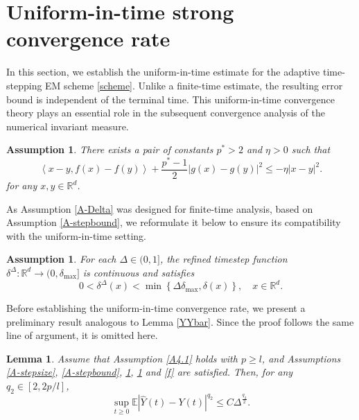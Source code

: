 \documentclass[preprint,12pt,compress]{elsarticle}
\newtheorem{lemma}[theorem]{Lemma}%
\newtheorem{assumption}[theorem]{Assumption}
\begin{document}
\section{Uniform-in-time strong convergence rate}  \label{sec6}
In this section, we establish the uniform-in-time estimate for the adaptive time-stepping EM scheme \eqref{scheme}. Unlike a finite-time estimate, the resulting error bound is independent of the terminal time. This uniform-in-time convergence theory plays an essential role in the subsequent convergence analysis of the numerical invariant measure.


\begin{assumption}  \label{A5.1}
There exists a pair of constants $p^* > 2$ and $\eta>0$ such that 
\begin{equation*}
	\left\langle {x - y,f(x) - f(y)} \right\rangle  + \frac{{{p^*} - 1}}{2}{\left| {g(x) - g(y)} \right|^2} \le  - \eta {\left| {x - y} \right|^2}.
\end{equation*}
for any $x, y \in \mathbb{R}^d$.
\end{assumption}

As Assumption \ref{A-Delta} was designed for finite-time analysis, based on Assumption \ref{A-stepbound}, we reformulate it below to ensure its compatibility with the uniform-in-time setting.
\begin{assumption}  \label{A6.2}
For each $\Delta \in (0, 1]$, the refined timestep function $\delta^\Delta: \mathbb{R}^d \to (0, \delta_{\max}]$ is continuous and satisfies
\begin{equation*}
	0 < {\delta ^\Delta }(x) < \min \left\{ {\Delta {\delta _{\max }},\delta (x)} \right\}, \quad  x \in \mathbb{R}^d.
\end{equation*}
\end{assumption}

Before establishing the uniform-in-time convergence rate, we present a preliminary result analogous to Lemma \ref{YYbar}. Since the proof follows the same line of argument, it is omitted here.

\begin{lemma}  \label{lem-6.3}
Assume that Assumption \ref{A4.1} holds with $p \ge l$, and Assumptions \ref{A-stepsize}, \ref{A-stepbound}, \ref{A5.1}, \ref{A6.2} and \eqref{f} are satisfied. Then, for any $q_2 \in [2, 2p/l]$, 
\begin{equation*}
	\mathop {\sup }\limits_{t \ge 0} \mathbb{E}{\left| {\hat Y(t) - Y(t)} \right|^{{q_2}}} \le C{\Delta ^{\frac{{{q_2}}}{2}}}.
\end{equation*}

\end{lemma}
\end{document}
